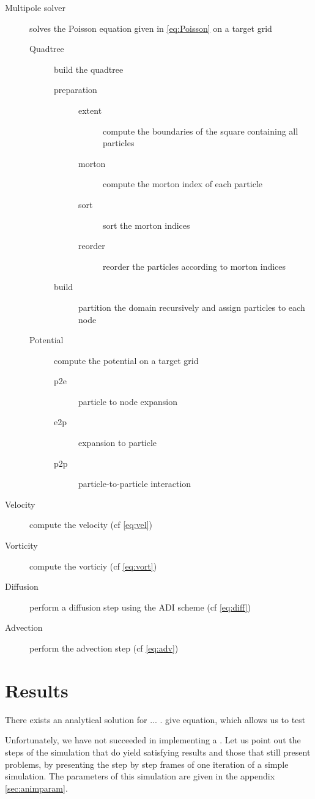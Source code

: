 \documentclass[a4paper,12pt,twoside]{article}
\begin{document}
\begin{description}
\item[Multipole solver] solves the Poisson equation given in \ref{eq:Poisson} on a target grid
\begin{description}
	\item[Quadtree] build the quadtree 
	\begin{description}
		\item[preparation]
			\begin{description}
			\item[extent] compute the boundaries of the square containing all particles 
			\item[morton] compute the morton index of each particle 
			\item[sort] sort the morton indices
			\item[reorder] reorder the particles according to morton indices 
			\end{description}
		\item[build] partition the domain recursively and assign particles to each node 
	\end{description}
	\item[Potential] compute the potential on a target grid 
		\begin{description}
		\item[p2e] particle to node expansion 
		\item[e2p] expansion to particle 
		\item[p2p] particle-to-particle interaction 
		\end{description}
\end{description}
\item[Velocity] compute the velocity (cf \ref{eq:vel})
\item[Vorticity] compute the vorticiy (cf \ref{eq:vort})
\item[Diffusion] perform a diffusion step using the ADI scheme (cf \ref{eq:diff})
\item[Advection] perform the advection step (cf \ref{eq:adv})
\end{description}


\section{Results}

There exists an analytical solution for ... . give equation, which allows us to test 

Unfortunately, we have not succeeded in implementing a . Let us point out the steps of the simulation that do yield satisfying results and those that still present problems, by presenting the step by step frames of one iteration of a simple simulation. The parameters of this simulation are given in the appendix \ref{sec:animparam}. 
\end{document}
